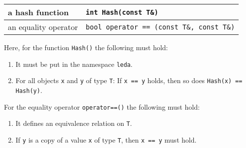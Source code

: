 \begin{enumerate}
\begin{tabular}[h]{|ll|}
		a hash function & \verb$int Hash(const T&)$\\
   \hline
		an equality operator & \verb$bool operator == (const T&, const T&)$\\
   \hline
	      
	    
	  \end{tabular}




        

 

Here, for the function \verb$Hash()$ the following must
hold:

\begin{enumerate}
 
            \item 
              

 It must be put in the namespace \verb$leda$.
            
            \item 
                

 For all objects \verb$x$ and
                \verb$y$ of type \verb$T$: If
                \verb$x == y$ holds, then so does \verb$Hash(x) == Hash(y)$.
            
          
\end{enumerate}






        

 For the equality operator
        \verb$operator==()$ the following must hold:

\begin{enumerate}
 
            \item 
                

 It defines an equivalence relation on
                \verb$T$.
            
            \item 
                

 If \verb$y$ is a copy of a value
                \verb$x$ of type \verb$T$, then
                \verb$x == y$ must hold.
            
          
\end{enumerate}






      








\end{enumerate}
